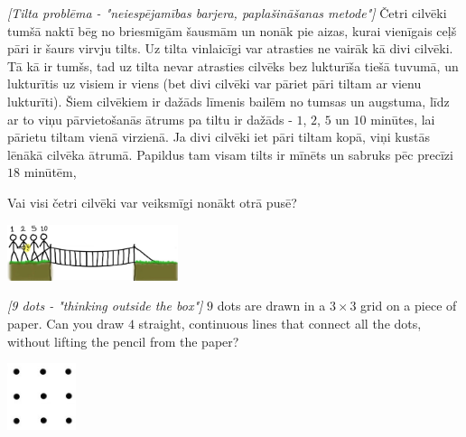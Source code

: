 





\noindent 

\begin{problem}
\textit{[Tilta problēma - "neiespējamības barjera, paplašināšanas metode"]}
Četri cilvēki tumšā naktī bēg no briesmīgām šausmām un nonāk pie aizas, kurai vienīgais ceļš pāri ir šaurs virvju tilts. Uz tilta vinlaicīgi var atrasties ne vairāk kā divi cilvēki. Tā kā ir tumšs, tad uz tilta nevar atrasties cilvēks bez lukturīša tiešā tuvumā, un lukturītis uz visiem ir viens (bet divi cilvēki var pāriet pāri tiltam ar vienu lukturīti).  
Šiem cilvēkiem ir dažāds līmenis bailēm no tumsas un augstuma, līdz ar to viņu pārvietošanās ātrums pa tiltu ir dažāds - $1$, $2$, $5$ un $10$ minūtes, lai pārietu tiltam vienā virzienā. Ja divi cilvēki iet pāri tiltam kopā, viņi kustās lēnākā cilvēka ātrumā.
Papildus tam visam tilts ir mīnēts un sabruks pēc precīzi $18$ minūtēm,

Vai visi četri cilvēki var veiksmīgi nonākt otrā pusē?
\begin{center}
\includegraphics[width=5cm]{bridge.jpg}
\label{fig:bridge}
\end{center}
\end{problem}
%

\begin{problem}
\textit{[9 dots - "thinking outside the box"]}
$9$ dots are drawn in a $3 \times 3$ grid on a piece of paper. Can you draw $4$ straight, continuous lines that connect all the dots, without lifting the pencil from the paper?
\begin{center}
\includegraphics[width=2cm]{3by3.jpg}
\label{fig:bridge}
\end{center}
\end{problem}
%

